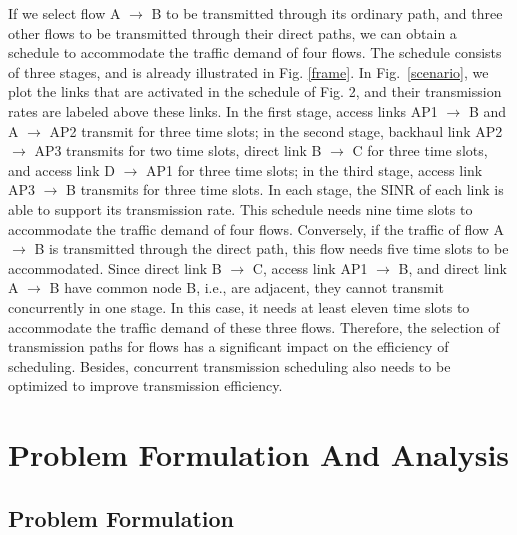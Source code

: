 \documentclass[journal]{IEEEtran}
\begin{document}
If we select flow A $\to$ B to be transmitted through its ordinary path, and three other flows to
be transmitted through their direct paths, we can obtain a schedule to accommodate the traffic
demand of four flows. The schedule consists of three stages, and is already illustrated in Fig.
\ref{frame}. In Fig.~\ref{scenario}, we plot the links that are activated in the schedule of Fig.
2, and their transmission rates are labeled above these links. In the first stage, access links AP1
$\to$ B and A $\to$ AP2 transmit for three time slots; in the second stage, backhaul link AP2 $\to$
AP3 transmits for two time slots, direct link B $\to$ C for three time slots, and access link D
$\to$ AP1 for three time slots; in the third stage, access link AP3 $\to$ B transmits for three
time slots. In each stage, the SINR of each link is able to support its transmission rate. This
schedule needs nine time slots to accommodate the traffic demand of four flows. Conversely, if the
traffic of flow A $\to$ B is transmitted through the direct path, this flow needs five time slots
to be accommodated. Since direct link B $\to$ C, access link AP1 $\to$ B, and direct link A $\to$ B
have common node B, i.e., are adjacent, they cannot transmit concurrently in one stage. In this
case, it needs at least eleven time slots to accommodate the traffic demand of these three flows.
Therefore, the selection of transmission paths for flows has a significant impact on the efficiency
of scheduling. Besides, concurrent transmission scheduling also needs to be optimized to improve
transmission efficiency.







\section{Problem Formulation And Analysis}\label{S4}


\subsection{Problem Formulation} \label{S4-1}
\end{document}
